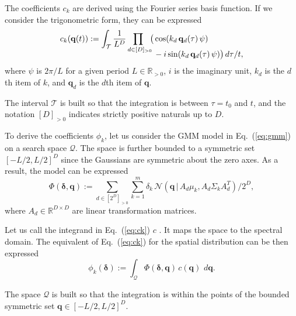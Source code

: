 \documentclass[letterpaper,10pt,conference,twoside]{IEEEtran}
\theoremstyle{definition}
\begin{document}
The coefficients $c_k$ are derived using the Fourier series basis function. If we consider the trigonometric form, they can be expressed
\begin{equation}\label{eq:ck}
  \begin{split}
    c_k(\mathbf{q}(t)):=\int_{\mathcal{T}}\frac{1}{L^D}\prod_{d\in[D]_{>0}\hspace*{-1ex}}\big(& \cos(k_d\,\mathbf{q}_d(\tau)\,\psi)\\[-2ex]
    &\vspace*{-4ex}-i\sin(k_d\,\mathbf{q}_d(\tau)\,\psi) \big)\,d\tau/t,
  \end{split}
\end{equation}
where $\psi$ is $2\pi/L$ for a given period $L\in\mathbb{R}_{>0}$, $i$ is the imaginary unit, $k_d$ is the $d$th item of $k$, and $\mathbf{q}_d$ is the $d$th item of $\mathbf{q}$.

The interval $\mathcal{T}$ is built so that the integration is between $\tau=t_0$ and $t$, and the notation $[D]_{>0}$ indicates strictly positive naturals up to $D$.


To derive the coefficients $\phi_k$, let us consider the GMM model in Eq.~(\ref{eq:gmm}) on a search space $\mathcal{Q}$. The space is further bounded to a symmetric set $[-L/2,L/2]^D$ since the Gaussians are symmetric about the zero axes. %
As a result, the model can be expressed~\cite{calinon2020mixture}
\begin{equation}
  \Phi(\boldsymbol{\delta},\mathbf{q}):=\sum_{d\in[2^D]_{>0}}\sum_{k=1}^{m}\delta_k\,\mathcal{N}(\mathbf{q}\,|\,A_d\mu_k,A_d\Sigma_k A_d^T)/2^D,
\end{equation}
where $A_d\in\mathbb{R}^{D\times D}$ are linear transformation matrices. 

Let us call the integrand in Eq.~(\ref{eq:ck}) $c$%
. It maps the space to the spectral domain. The equivalent of Eq.~(\ref{eq:ck}) for the spatial distribution can be then expressed
\begin{equation}\label{eq:phik}
  \phi_k(\boldsymbol{\delta}):=\int_{\mathcal{Q}} \Phi(\boldsymbol{\delta},\mathbf{q})\,c(\mathbf{q})\,\,d\mathbf{q}.
\end{equation}

The space $\mathcal{Q}$ is built so that the integration is within the points of the bounded symmetric set $\mathbf{q}\in[-L/2,L/2]^D$.
\end{document}
